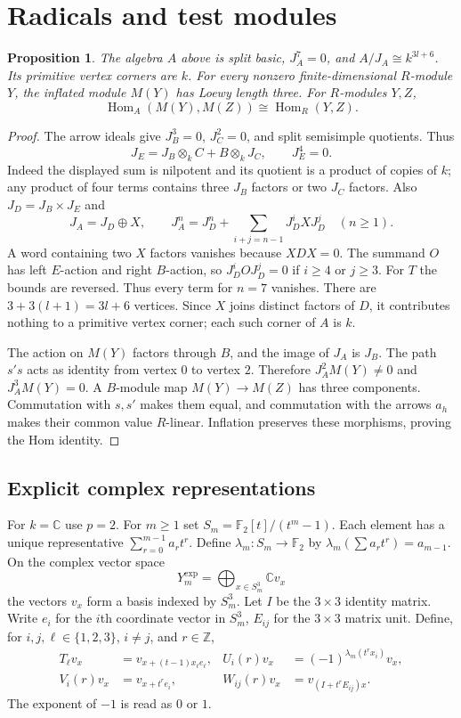 \documentclass[11pt]{article}
\numberwithin{equation}{section}
\newtheorem{proposition}[theorem]{Proposition}
\theoremstyle{definition}
\theoremstyle{remark}
\newcommand{\C}{\mathbb C}
\newcommand{\F}{\mathbb F}
\newcommand{\Z}{\mathbb Z}
\DeclareMathOperator{\Hom}{Hom}
\begin{document}
\section{Radicals and test modules}\label{sec:refinements}
\begin{proposition}\label{prop:radical}
The algebra $A$ above is split basic, $J_A^7=0$, and
$A/J_A\cong k^{3l+6}$. Its primitive vertex corners are $k$.
For every nonzero finite-dimensional $R$-module $Y$, the inflated
module $M(Y)$ has Loewy length three. For $R$-modules $Y,Z$,
\[
\Hom_A(M(Y),M(Z))\cong\Hom_R(Y,Z).
\]
\end{proposition}
\begin{proof}
The arrow ideals give $J_B^3=0$, $J_C^2=0$, and split semisimple
quotients. Thus
\[
J_E=J_B\otimes_k C+B\otimes_kJ_C,\qquad J_E^4=0.
\]
Indeed the displayed sum is nilpotent and its quotient is a product
of copies of $k$; any product of four terms contains three $J_B$
factors or two $J_C$ factors. Also $J_D=J_B\times J_E$ and
\[
J_A=J_D\oplus X,\qquad
J_A^n=J_D^n+\sum_{i+j=n-1}J_D^iXJ_D^j\quad(n\ge1).
\]
A word containing two $X$ factors vanishes because $XDX=0$.
The summand $O$ has left $E$-action and right $B$-action, so
$J_D^iOJ_D^j=0$ if $i\ge4$ or $j\ge3$. For $T$ the bounds are
reversed. Thus every term for $n=7$ vanishes.
There are $3+3(l+1)=3l+6$ vertices. Since $X$ joins distinct factors
of $D$, it contributes nothing to a primitive vertex corner;
each such corner of $A$ is $k$.

The action on $M(Y)$ factors through $B$, and the image of $J_A$
is $J_B$. The path $s's$ acts as identity from vertex $0$ to vertex
$2$. Therefore $J_A^2M(Y)\ne0$ and $J_A^3M(Y)=0$.
A $B$-module map $M(Y)\to M(Z)$ has three components. Commutation
with $s,s'$ makes them equal, and commutation with the arrows
$a_h$ makes their common value $R$-linear. Inflation preserves
these morphisms, proving the Hom identity.
\end{proof}

\subsection{Explicit complex representations}
For $k=\C$ use $p=2$. For $m\ge1$ set
$S_m=\F_2[t]/(t^m-1)$. Each element has a unique representative
$\sum_{r=0}^{m-1}a_rt^r$. Define $\lambda_m:S_m\to\F_2$ by
$\lambda_m(\sum a_rt^r)=a_{m-1}$. On the complex vector space
\[
Y_m^{\mathrm{exp}}=\bigoplus_{x\in S_m^3}\C v_x
\]
the vectors $v_x$ form a basis indexed by $S_m^3$.
Let $I$ be the $3\times3$ identity matrix. Write $e_i$ for the $i$th coordinate vector in $S_m^3$, $E_{ij}$
for the $3\times3$ matrix unit.
Define, for $i,j,\ell\in\{1,2,3\}$, $i\ne j$, and $r\in\Z$,
\begin{align*}
T_\ell v_x&=v_{x+(t-1)x_\ell e_\ell},&
U_i(r)v_x&=(-1)^{\lambda_m(t^rx_i)}v_x,\\
V_i(r)v_x&=v_{x+t^re_i},&
W_{ij}(r)v_x&=v_{(I+t^rE_{ij})x}.
\end{align*}
The exponent of $-1$ is read as $0$ or $1$.
\end{document}
